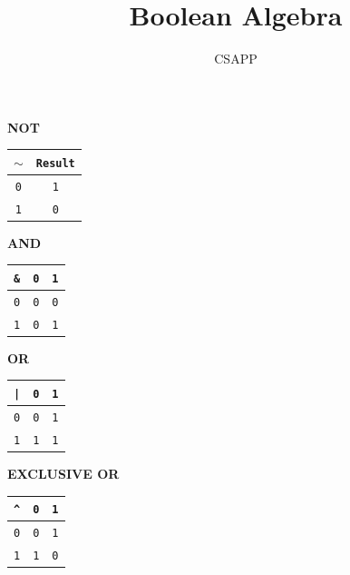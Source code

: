 \documentclass{article}
\title{Boolean Algebra}
\author{CSAPP}
\begin{document}
\maketitle

\begin{center}

    \textbf{\small NOT}\\[0.5em]
    \begin{tabular}{cc}
        \toprule
        $\sim $ & \texttt{Result} \\
        \midrule
        \texttt{0} & \texttt{1} \\
        \texttt{1} & \texttt{0} \\
        \bottomrule
    \end{tabular}

    \bigskip

    \textbf{\small AND}\\[0.5em]
    \begin{tabular}{ccc}
        \toprule
        \texttt{\&} & \texttt{0} & \texttt{1} \\
        \midrule
        \texttt{0}  & \texttt{0} & \texttt{0} \\
        \texttt{1}  & \texttt{0} & \texttt{1} \\
        \bottomrule
    \end{tabular}

    \bigskip

    \textbf{\small OR}\\[0.5em]
    \begin{tabular}{ccc}
        \toprule
        \texttt{|} & \texttt{0} & \texttt{1}\\
        \midrule
        \texttt{0} & \texttt{0} & \texttt{1}\\
        \texttt{1} & \texttt{1} & \texttt{1}\\
        \bottomrule
    \end{tabular}

    \bigskip

    \textbf{\small EXCLUSIVE OR}\\[0.5em]
    \begin{tabular}{ccc}
        \toprule
        \texttt{\^} & \texttt{0} & \texttt{1}\\
        \midrule
        \texttt{0} & \texttt{0} & \texttt{1}\\
        \texttt{1} & \texttt{1} & \texttt{0}\\
        \bottomrule
    \end{tabular}

\end{center}
\end{document}
